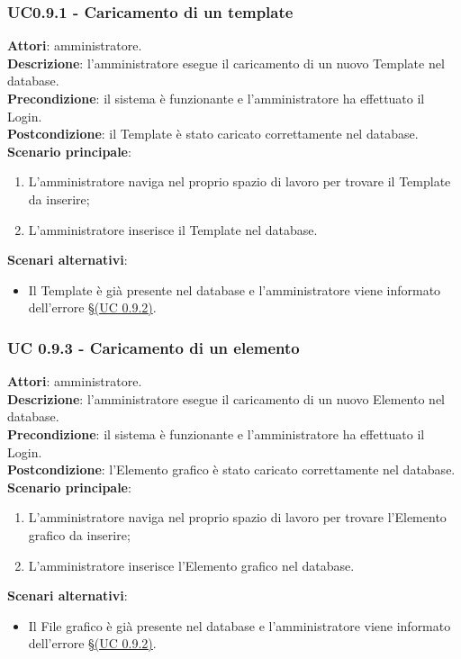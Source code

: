 \subsubsection{UC0.9.1 - Caricamento di un template}{
	\label{uc0.9.1}
	\textbf{Attori}: amministratore. \\
	\textbf{Descrizione}: l'amministratore esegue il caricamento di un nuovo Template nel database. \\
	\textbf{Precondizione}: il sistema  è funzionante e l'amministratore ha effettuato il Login.	\\
	\textbf{Postcondizione}: il Template è stato caricato correttamente nel database.	\\
	\textbf{Scenario principale}:
	\begin{enumerate}
		\item L'amministratore naviga nel proprio spazio di lavoro  per trovare il Template da inserire;
		\item L'amministratore inserisce il Template nel database.
	\end{enumerate}
	\textbf{Scenari alternativi}:
	\begin{itemize}
		\item Il Template è già presente nel database e l'amministratore viene informato dell'errore \S\hyperref[uc0.9.2]{(UC 0.9.2)}.
	\end{itemize}
	}
\subsubsection{UC 0.9.3 - Caricamento di un elemento}{
	\label{uc0.9.3}
	\textbf{Attori}: amministratore. \\
	\textbf{Descrizione}: l'amministratore esegue il caricamento di un nuovo Elemento nel database. \\
	\textbf{Precondizione}: il sistema  è funzionante e l'amministratore ha effettuato il Login.	\\
	\textbf{Postcondizione}: l'Elemento grafico è stato caricato correttamente nel database.	\\
	\textbf{Scenario principale}:
	\begin{enumerate}
		\item L'amministratore naviga nel proprio spazio di lavoro per trovare l'Elemento grafico da inserire;
		\item L'amministratore inserisce l'Elemento grafico nel database.
	\end{enumerate}
	\textbf{Scenari alternativi}:
	\begin{itemize}
		\item Il File grafico è già presente nel database e l'amministratore viene informato dell'errore \S\hyperref[uc0.9.2]{(UC 0.9.2)}.
	\end{itemize}
	}
